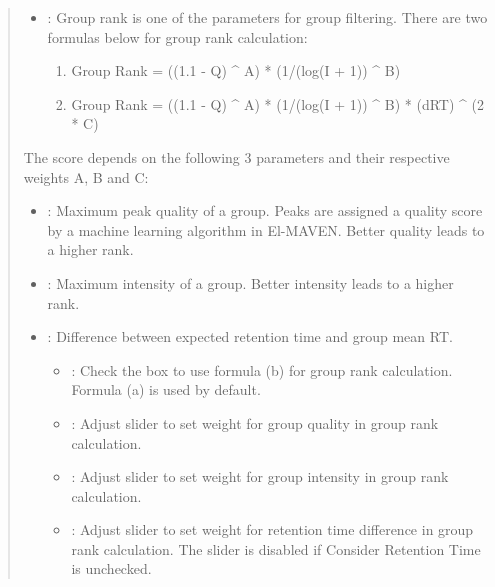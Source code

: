 \documentclass[letterpaper,10pt,english,openany,oneside]{sphinxmanual}
\begin{document}
\begin{quote}
\begin{itemize}
\item {} 
: Group rank is one of the parameters for group filtering. There are two formulas below for group rank calculation:
\begin{enumerate}
\item {} 
Group Rank = ((1.1 - Q) \textasciicircum{} A) * (1/(log(I + 1)) \textasciicircum{} B)

\item {} 
Group Rank = ((1.1 - Q) \textasciicircum{} A) * (1/(log(I + 1)) \textasciicircum{} B) * (dRT) \textasciicircum{} (2 * C)

\end{enumerate}

\end{itemize}

The score depends on the following 3 parameters and their respective weights A, B and C:
\begin{itemize}
\item {} 
: Maximum peak quality of a group. Peaks are assigned a quality score by a machine learning algorithm in El-MAVEN. Better quality leads to a higher rank.

\item {} 
: Maximum intensity of a group. Better intensity leads to a higher rank.

\item {} 
: Difference between expected retention time and group mean RT.
\begin{itemize}
\item {} 
: Check the box to use formula (b) for group rank calculation. Formula (a) is used by default.

\item {} 
: Adjust slider to set weight for group quality in group rank calculation.

\item {} 
: Adjust slider to set weight for group intensity in group rank calculation.

\item {} 
: Adjust slider to set weight for retention time difference in group rank calculation. The slider is disabled if Consider Retention Time is unchecked.

\end{itemize}

\end{itemize}
\end{quote}
\end{document}

